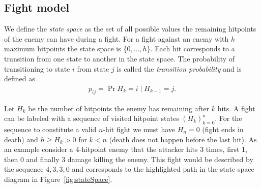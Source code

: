 \subsection{Fight model}\label{chap:fightModel}
We define the \textit{state space} as the set of all possible values the remaining hitpoints of the enemy can have during a fight. For a fight against an enemy with $h$ maximum hitpoints the state space is $\{0,\ldots,h\}$. Each hit corresponds to a transition from one state to another in the state space. The probability of transitioning to state $i$ from state $j$ is called the \textit{transition probability} and is defined as
\begin{align}\label{eq:transitionProbabilities}
    p_{ij} = \Pr{H_k = i \mid H_{k-1} = j}.
\end{align}

Let $H_k$ be the number of hitpoints the enemy has remaining after $k$ hits. A fight can be labeled with a sequence of visited hitpoint states $(H_k)_{k=0}^{n}$. For the sequence to constitute a valid $n$-hit fight we must have $H_n=0$ (fight ends in death) and $h \geq H_k > 0$ for $k<n$ (death does not happen before the last hit). As an example consider a 4-hitpoint enemy that the attacker hits 3 times, first 1, then 0 and finally 3 damage killing the enemy. This fight would be described by the sequence $4,3,3,0$ and corresponds to the highlighted path in the state space diagram in Figure~\ref{fig:stateSpace}.
